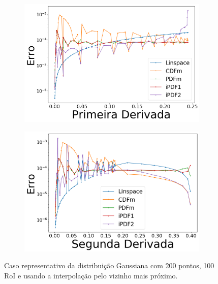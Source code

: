\begin{figure}[H]
	\begin{subfigure}[b]{0.45\textwidth}
		\centering 
		\includegraphics[width=\textwidth]{./figuras/error_normal_nearest_Primeira_Derivada.png}
		\caption{}
		\label{fig:12c}
	\end{subfigure}
	\hfill
	\begin{subfigure}[b]{0.45\textwidth}
		\centering 
		\includegraphics[width=\textwidth]{./figuras/error_normal_nearest_Segunda_Derivada.png}
		\caption{}
		\label{fig:12d}
	\end{subfigure}
	\caption{Caso representativo da distribuição Gaussiana com 200 pontos, 100 \ac{RoI} e usando a interpolação pelo vizinho mais próximo.}
	\label{fig:12}
\end{figure}

